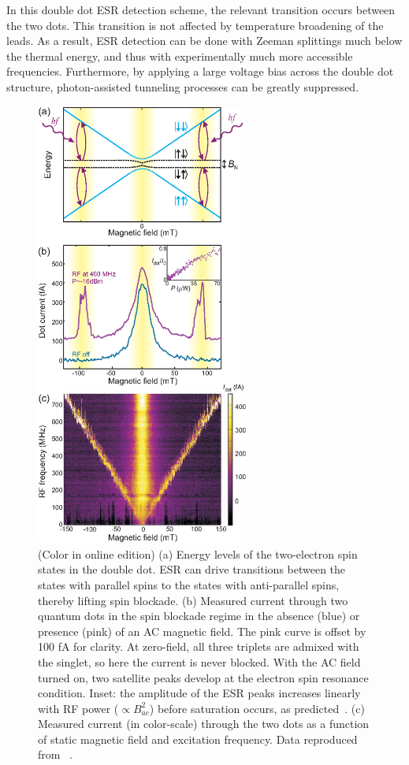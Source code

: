 \documentclass[12pt,aps,nofootinbib]{revtex4-1}
\begin{document}
In this double dot ESR detection scheme, the relevant transition
occurs between the two dots. This transition is not affected by
temperature broadening of the leads. As a result, ESR detection
can be done with Zeeman splittings much below the thermal energy,
and thus with experimentally much more accessible frequencies.
Furthermore, by applying a large voltage bias across the double
dot structure, photon-assisted tunneling processes can be greatly
suppressed.

\begin{figure}[!htb]
\includegraphics[width=7cm]{hanson_fig43.eps}
\caption{(Color in online edition) (a) Energy levels of the two-electron spin states in the
double dot. ESR can drive transitions between the states with
parallel spins to the states with anti-parallel spins, thereby
lifting spin blockade. (b) Measured current through two quantum
dots in the spin blockade regime in the absence (blue) or presence
(pink) of an AC magnetic field. The pink curve is offset by 100 fA for clarity. 
At zero-field, all three triplets are admixed with the singlet, so here the current is never
blocked. With the AC field turned on, two satellite peaks develop
at the electron spin resonance condition. Inset: the amplitude of
the ESR peaks increases linearly with RF power ($\propto
B_{ac}^2$) before saturation occurs, as predicted~\cite{engel01}.
(c) Measured current (in color-scale) through the two dots as a
function of static magnetic field and excitation frequency. Data reproduced from ~\textcite{koppens06}.}
\label{fig:ESR_spectroscopy}
\end{figure}
\end{document}
